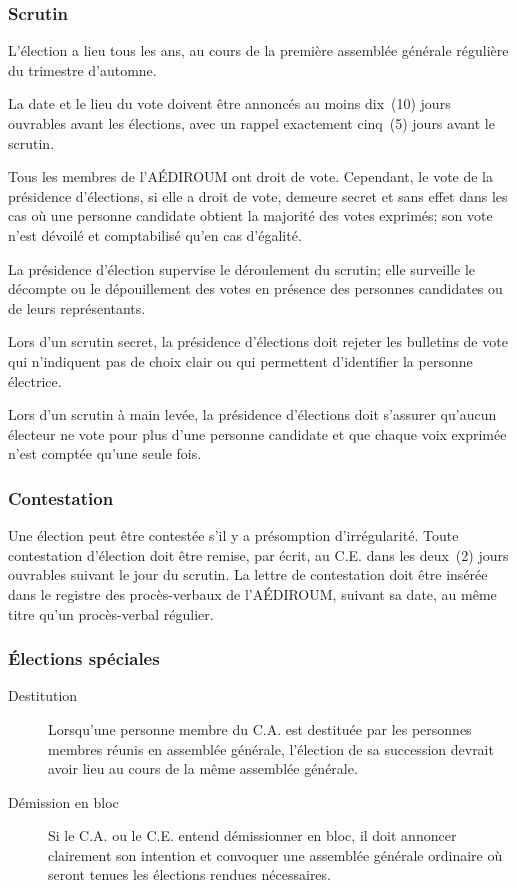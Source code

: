 \documentclass{aediroum}
\begin{document}
\subsubsection{Scrutin}\label{sec:scrutin-elections}

L'élection a lieu tous les ans, au cours de la première assemblée générale régulière du trimestre d'automne.

La date et le lieu du vote doivent être annoncés au moins dix~(10) jours ouvrables avant les élections, avec un rappel exactement cinq~(5) jours avant le scrutin.

Tous les membres de l'AÉDIROUM ont droit de vote. Cependant, le vote de la présidence d'élections, si elle a droit de vote, demeure secret et sans effet dans les cas où une personne candidate obtient la majorité des votes exprimés; son vote n'est dévoilé et comptabilisé qu'en cas d'égalité.

La présidence d'élection supervise le déroulement du scrutin; elle surveille le décompte ou le dépouillement des votes en présence des personnes candidates ou de leurs représentants.

Lors d'un scrutin secret, la présidence d'élections doit rejeter les bulletins de vote qui n'indiquent pas de choix clair ou qui permettent d'identifier la personne électrice.

Lors d'un scrutin à main levée, la présidence d'élections doit s'assurer qu'aucun électeur ne vote pour plus d'une personne candidate et que chaque voix exprimée n'est comptée qu'une seule fois.

\subsubsection{Contestation}\label{sec:contestation}

Une élection peut être contestée s'il y a présomption d'irrégularité. Toute contestation d'élection doit être remise, par écrit, au C.E. dans les deux~(2) jours ouvrables suivant le jour du scrutin. La lettre de contestation doit être insérée dans le registre des procès-verbaux de l'AÉDIROUM, suivant sa date, au même titre qu'un procès-verbal régulier.

\subsubsection{Élections spéciales}\label{sec:elections-speciales}

\begin{description}
    \item[Destitution] Lorsqu'une personne membre du C.A. est destituée par les personnes membres réunis en assemblée générale, l'élection de sa succession devrait avoir lieu au cours de la même assemblée générale.
    \item[Démission en bloc] Si le C.A. ou le C.E. entend démissionner en bloc, il doit annoncer clairement son intention et convoquer une assemblée générale ordinaire où seront tenues les élections rendues nécessaires.
\end{description}
\end{document}

